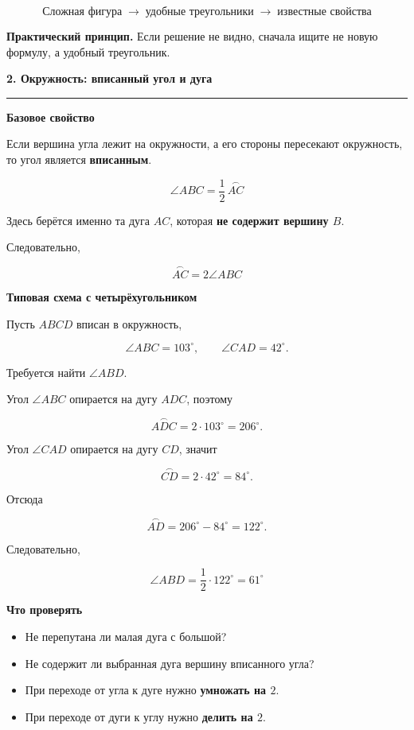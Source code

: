 \documentclass[a4paper,12pt]{article}
\newcommand{\topic}[1]{%
  \vspace{0.8em}
  {\Large\bfseries\textcolor{darkaccent}{#1}}\par
  \vspace{0.25em}
  {\color{accent}\rule{\linewidth}{0.6pt}}
  \vspace{0.45em}
}
\newcommand{\subtopic}[1]{%
  \vspace{0.45em}
  {\large\bfseries\textcolor{accent}{#1}}\par
  \vspace{0.2em}
}
\newcommand{\key}[1]{\textcolor{darkaccent}{\textbf{#1}}}
\begin{document}
\[
\boxed{\text{Сложная фигура}
\;\longrightarrow\;
\text{удобные треугольники}
\;\longrightarrow\;
\text{известные свойства}}
\]

\key{Практический принцип.}
Если решение не видно, сначала ищите не новую формулу, а удобный треугольник.


\topic{2. Окружность: вписанный угол и дуга}

\subtopic{Базовое свойство}

Если вершина угла лежит на окружности, а его стороны пересекают окружность, то угол является \key{вписанным}.

\[
\boxed{
\angle ABC=
\frac12\,\overset{\frown}{AC}
}
\]

Здесь берётся именно та дуга \(AC\), которая \key{не содержит вершину \(B\)}.

Следовательно,

\[
\boxed{
\overset{\frown}{AC}=2\angle ABC
}
\]

\subtopic{Типовая схема с четырёхугольником}

Пусть \(ABCD\) вписан в окружность,

\[
\angle ABC=103^\circ,
\qquad
\angle CAD=42^\circ.
\]

Требуется найти \(\angle ABD\).

Угол \(\angle ABC\) опирается на дугу \(ADC\), поэтому

\[
\overset{\frown}{ADC}
=
2\cdot103^\circ
=
206^\circ.
\]

Угол \(\angle CAD\) опирается на дугу \(CD\), значит

\[
\overset{\frown}{CD}
=
2\cdot42^\circ
=
84^\circ.
\]

Отсюда

\[
\overset{\frown}{AD}
=
206^\circ-84^\circ
=
122^\circ.
\]

Следовательно,

\[
\boxed{
\angle ABD
=
\frac12\cdot122^\circ
=
61^\circ
}
\]

\subtopic{Что проверять}

\begin{itemize}
  \item Не перепутана ли малая дуга с большой?
  \item Не содержит ли выбранная дуга вершину вписанного угла?
  \item При переходе от угла к дуге нужно \key{умножать на \(2\)}.
  \item При переходе от дуги к углу нужно \key{делить на \(2\)}.
\end{itemize}
\end{document}
